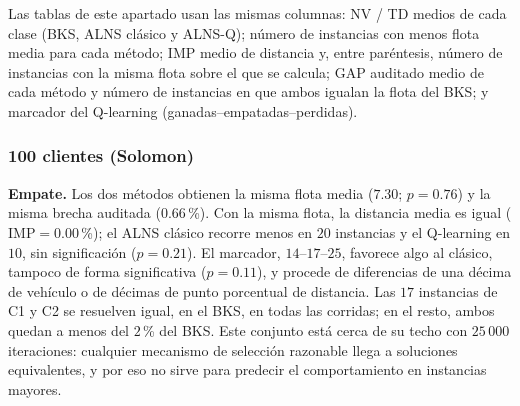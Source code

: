 Las tablas de este apartado usan las mismas columnas: NV / TD medios de cada clase (BKS, ALNS
clásico y ALNS-Q); número de instancias con menos flota media para cada método; IMP medio de
distancia y, entre paréntesis, número de instancias con la misma flota sobre el que se
calcula; GAP auditado medio de cada método y número de instancias en que ambos igualan la
flota del BKS; y marcador del Q-learning (ganadas--empatadas--perdidas).

\subsubsection{100 clientes (Solomon)}
\label{sec:exp-100}

\begin{table}[H]
\centering
\caption{Solomon, $100$ clientes: resultados por clase.}
\label{tab:res-100}
\end{table}

\textbf{Empate.} Los dos métodos obtienen la misma flota media ($7.30$; $p=0.76$) y la misma
brecha auditada ($0.66$\,\%). Con la misma flota, la distancia media es igual
($\mathrm{IMP}=0.00$\,\%); el ALNS clásico recorre menos en $20$ instancias y el Q-learning en
$10$, sin significación ($p=0.21$). El marcador, $14$--$17$--$25$, favorece algo al clásico,
tampoco de forma significativa ($p=0.11$), y procede de diferencias de una décima de vehículo
o de décimas de punto porcentual de distancia. Las $17$ instancias de C1 y C2 se resuelven
igual, en el BKS, en todas las corridas; en el resto, ambos quedan a menos del $2$\,\% del BKS.
Este conjunto está cerca de su techo con $25\,000$ iteraciones: cualquier mecanismo de
selección razonable llega a soluciones equivalentes, y por eso no sirve para predecir el
comportamiento en instancias mayores.

